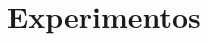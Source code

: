 \documentclass[oneside,openright,12pt]{ufsm_2015} %
\begin{document}

\chapter{Experimentos}
\label{sec:experimentos}
\end{document}
